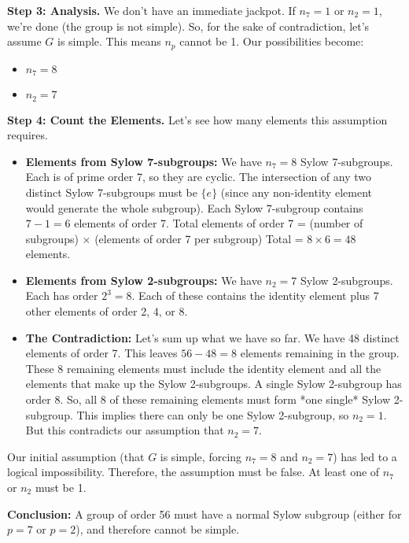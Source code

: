\documentclass[12pt,a4paper]{article}
\theoremstyle{plain} %
\theoremstyle{definition} %
\theoremstyle{remark} %
\begin{document}
\textbf{Step 3: Analysis.}
We don't have an immediate jackpot. If $n_7=1$ or $n_2=1$, we're done (the group is not simple).
So, for the sake of contradiction, let's assume $G$ is simple. This means $n_p$ cannot be 1.
Our possibilities become:
\begin{itemize}
    \item $n_7 = 8$
    \item $n_2 = 7$
\end{itemize}

\textbf{Step 4: Count the Elements.}
Let's see how many elements this assumption requires.
\begin{itemize}
    \item \textbf{Elements from Sylow 7-subgroups:}
    We have $n_7=8$ Sylow 7-subgroups. Each is of prime order 7, so they are cyclic. The intersection of any two distinct Sylow 7-subgroups must be $\{e\}$ (since any non-identity element would generate the whole subgroup).
    Each Sylow 7-subgroup contains $7-1=6$ elements of order 7.
    Total elements of order 7 = (number of subgroups) $\times$ (elements of order 7 per subgroup)
    Total = $8 \times 6 = 48$ elements.

    \item \textbf{Elements from Sylow 2-subgroups:}
    We have $n_2=7$ Sylow 2-subgroups. Each has order $2^3=8$.
    Each of these contains the identity element plus 7 other elements of order 2, 4, or 8.

    \item \textbf{The Contradiction:}
    Let's sum up what we have so far.
    We have 48 distinct elements of order 7.
    This leaves $56 - 48 = 8$ elements remaining in the group.
    These 8 remaining elements must include the identity element and all the elements that make up the Sylow 2-subgroups.
    A single Sylow 2-subgroup has order 8. So, all 8 of these remaining elements must form *one single* Sylow 2-subgroup.
    This implies there can only be one Sylow 2-subgroup, so $n_2=1$.
    But this contradicts our assumption that $n_2=7$.
\end{itemize}
Our initial assumption (that $G$ is simple, forcing $n_7=8$ and $n_2=7$) has led to a logical impossibility. Therefore, the assumption must be false. At least one of $n_7$ or $n_2$ must be 1.

\textbf{Conclusion:} A group of order 56 must have a normal Sylow subgroup (either for $p=7$ or $p=2$), and therefore cannot be simple.

\end{document}
